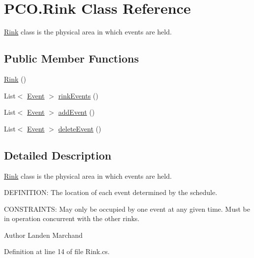 \hypertarget{classPCO_1_1Rink}{\section{P\+C\+O.\+Rink Class Reference}
\label{classPCO_1_1Rink}
}


\hyperlink{classPCO_1_1Rink}{Rink} class is the physical area in which events are held.  


\subsection*{Public Member Functions}
\begin{DoxyCompactItemize}
\item 
\hyperlink{classPCO_1_1Rink_ac0a83730147b9a04f26b0c41e5337be7}{Rink} ()
\item 
List$<$ \hyperlink{classPCO_1_1Event}{Event} $>$ \hyperlink{classPCO_1_1Rink_a683b279845f595abf88cc73f87e7f691}{rink\+Events} ()
\item 
List$<$ \hyperlink{classPCO_1_1Event}{Event} $>$ \hyperlink{classPCO_1_1Rink_a9c9ba575a6f1a1ee5df1283022f93317}{add\+Event} ()
\item 
List$<$ \hyperlink{classPCO_1_1Event}{Event} $>$ \hyperlink{classPCO_1_1Rink_a950e65a75cee57ec112969dc7fa59ac4}{delete\+Event} ()
\end{DoxyCompactItemize}


\subsection{Detailed Description}
\hyperlink{classPCO_1_1Rink}{Rink} class is the physical area in which events are held. 

D\+E\+F\+I\+N\+I\+T\+I\+O\+N\+: The location of each event determined by the schedule.

C\+O\+N\+S\+T\+R\+A\+I\+N\+T\+S\+: May only be occupied by one event at any given time. Must be in operation concurrent with the other rinks.\begin{DoxyAuthor}{Author}
Landen Marchand 
\end{DoxyAuthor}


Definition at line 14 of file Rink.\+cs.



